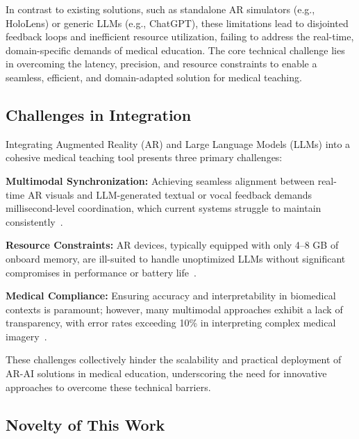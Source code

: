 \documentclass[10pt,letterpaper]{article}
\begin{document}
In contrast to existing solutions, such as standalone AR simulators (e.g., HoloLens) or generic LLMs (e.g., ChatGPT), these limitations lead to disjointed feedback loops and inefficient resource utilization, failing to address the real-time, domain-specific demands of medical education\cite{tang2020augmented,liu2023improvedllava}. The core technical challenge lies in overcoming the latency, precision, and resource constraints to enable a seamless, efficient, and domain-adapted solution for medical teaching\cite{adept2024fuyu}.

\subsection*{Challenges in Integration}

Integrating Augmented Reality (AR) and Large Language Models (LLMs) into a cohesive medical teaching tool presents three primary challenges:

\textbf{Multimodal Synchronization:} Achieving seamless alignment between real-time AR visuals and LLM-generated textual or vocal feedback demands millisecond-level coordination, which current systems struggle to maintain consistently~\cite{chen2022align, rasouli2024role}.

\textbf{Resource Constraints:} AR devices, typically equipped with only 4--8 GB of onboard memory, are ill-suited to handle unoptimized LLMs without significant compromises in performance or battery life~\cite{hu2021lora, dettmers2023qlora}.

\textbf{Medical Compliance:} Ensuring accuracy and interpretability in biomedical contexts is paramount; however, many multimodal approaches exhibit a lack of transparency, with error rates exceeding 10\% in interpreting complex medical imagery~\cite{adept2024fuyu, yadav2024use}.

These challenges collectively hinder the scalability and practical deployment of AR-AI solutions in medical education, underscoring the need for innovative approaches to overcome these technical barriers.

\subsection*{Novelty of This Work}
\end{document}
